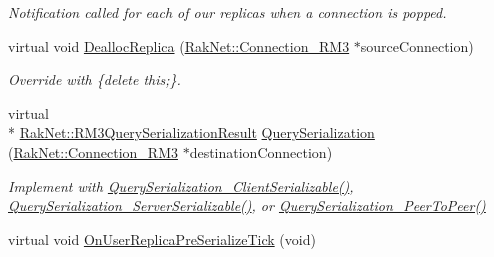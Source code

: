 \begin{DoxyCompactItemize}
\begin{DoxyCompactList}\small\item\em Notification called for each of our replicas when a connection is popped. \end{DoxyCompactList}\item 
virtual void \hyperlink{class_rak_net_1_1_replica3_composite_a403aa19294fd0c5adc64bd6204b7c134}{Dealloc\-Replica} (\hyperlink{class_rak_net_1_1_connection___r_m3}{Rak\-Net\-::\-Connection\-\_\-\-R\-M3} $\ast$source\-Connection)
\begin{DoxyCompactList}\small\item\em Override with \{delete this;\}. \end{DoxyCompactList}\item 
virtual \\*
\hyperlink{group___r_e_p_l_i_c_a___m_a_n_a_g_e_r___g_r_o_u_p3_ga9a29b413d7f2b9cb21c16457631d3aef}{Rak\-Net\-::\-R\-M3\-Query\-Serialization\-Result} \hyperlink{class_rak_net_1_1_replica3_composite_a4b09de10ab5fb4e5b28b385bef2a7a91}{Query\-Serialization} (\hyperlink{class_rak_net_1_1_connection___r_m3}{Rak\-Net\-::\-Connection\-\_\-\-R\-M3} $\ast$destination\-Connection)
\begin{DoxyCompactList}\small\item\em Implement with \hyperlink{class_rak_net_1_1_replica3_a8af3a3d3cee9098378deea019710852c}{Query\-Serialization\-\_\-\-Client\-Serializable()}, \hyperlink{class_rak_net_1_1_replica3_a2a2c5faec10124231298d43e6f628234}{Query\-Serialization\-\_\-\-Server\-Serializable()}, or \hyperlink{class_rak_net_1_1_replica3_a212c9fff207005acf494fb9c4ae9e194}{Query\-Serialization\-\_\-\-Peer\-To\-Peer()} \end{DoxyCompactList}\item 
\hypertarget{class_rak_net_1_1_replica3_composite_af3ae9825e4d7a61fd473f6e32c845a68}{virtual void \hyperlink{class_rak_net_1_1_replica3_composite_af3ae9825e4d7a61fd473f6e32c845a68}{On\-User\-Replica\-Pre\-Serialize\-Tick} (void)}\label{class_rak_net_1_1_replica3_composite_af3ae9825e4d7a61fd473f6e32c845a68}


\end{DoxyCompactItemize}
